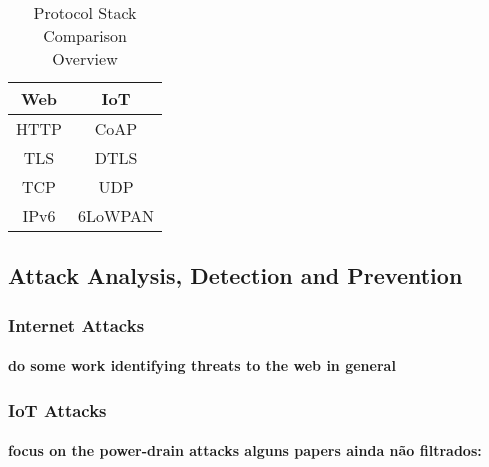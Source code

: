 \begin{table}[h]
	\centering
	\begin{center} \caption{Protocol Stack Comparison Overview } \end{center}
	\label{tab:stack}
	\begin{tabular}{c|c}
		Web & IoT \\
		\hline
		\ac{HTTP} & \ac{CoAP} \\
		\ac{TLS} & \ac{DTLS} \\
		\ac{TCP} & \ac{UDP} \\
		IPv6 & 6LoWPAN 
	\end{tabular}
\end{table}

\subsection{Attack Analysis, Detection and Prevention}

\subsubsection{Internet Attacks}
\paragraph{
do some work identifying threats to the web in general
}
\subsubsection{IoT Attacks}
\paragraph{
	focus on the power-drain attacks
	alguns papers ainda não filtrados: \cite{Vasserman2013,Vanitha2014}
}
